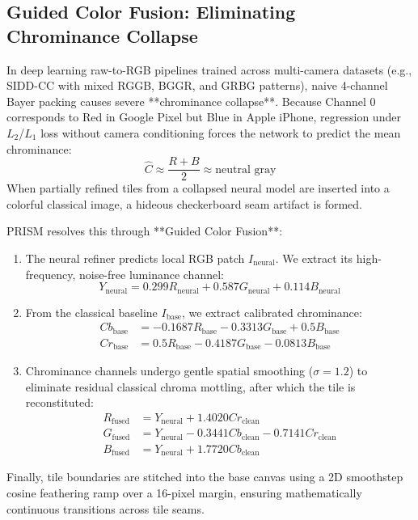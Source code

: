 \documentclass[10pt,twocolumn]{article}
\begin{document}
\subsection{Guided Color Fusion: Eliminating Chrominance Collapse}
In deep learning raw-to-RGB pipelines trained across multi-camera datasets (e.g., SIDD-CC with mixed RGGB, BGGR, and GRBG patterns), naive 4-channel Bayer packing causes severe **chrominance collapse**. Because Channel 0 corresponds to Red in Google Pixel but Blue in Apple iPhone, regression under $L_2$/$L_1$ loss without camera conditioning forces the network to predict the mean chrominance:
\begin{equation}
    \hat{C} \approx \frac{R + B}{2} \approx \text{neutral gray}
\end{equation}
When partially refined tiles from a collapsed neural model are inserted into a colorful classical image, a hideous checkerboard seam artifact is formed.

PRISM resolves this through **Guided Color Fusion**:
\begin{enumerate}
    \item The neural refiner predicts local RGB patch $I_{\text{neural}}$. We extract its high-frequency, noise-free luminance channel:
    \begin{equation}
        Y_{\text{neural}} = 0.299 R_{\text{neural}} + 0.587 G_{\text{neural}} + 0.114 B_{\text{neural}}
    \end{equation}
    \item From the classical baseline $I_{\text{base}}$, we extract calibrated chrominance:
    \begin{align}
        Cb_{\text{base}} &= -0.1687 R_{\text{base}} - 0.3313 G_{\text{base}} + 0.5 B_{\text{base}} \\
        Cr_{\text{base}} &= 0.5 R_{\text{base}} - 0.4187 G_{\text{base}} - 0.0813 B_{\text{base}}
    \end{align}
    \item Chrominance channels undergo gentle spatial smoothing ($\sigma = 1.2$) to eliminate residual classical chroma mottling, after which the tile is reconstituted:
    \begin{align}
        R_{\text{fused}} &= Y_{\text{neural}} + 1.4020 Cr_{\text{clean}} \\
        G_{\text{fused}} &= Y_{\text{neural}} - 0.3441 Cb_{\text{clean}} - 0.7141 Cr_{\text{clean}} \\
        B_{\text{fused}} &= Y_{\text{neural}} + 1.7720 Cb_{\text{clean}}
    \end{align}
\end{enumerate}
Finally, tile boundaries are stitched into the base canvas using a 2D smoothstep cosine feathering ramp over a 16-pixel margin, ensuring mathematically continuous transitions across tile seams.
\end{document}
